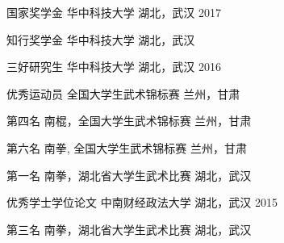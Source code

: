 \begin{xframe}{}
    \begin{cvhonors}

        \cvhonor
        {国家奖学金} %
        {华中科技大学} %
        {湖北，武汉} %
        {2017} %

        \cvhonor
        {知行奖学金} %
        {华中科技大学} %
        {湖北，武汉} %
        {} %


        \cvhonor
        {三好研究生} %
        {华中科技大学} %
        {湖北，武汉} %
        {2016} %




        \cvhonor
        {优秀运动员} %
        {全国大学生武术锦标赛} %
        {兰州，甘肃} %
        { } %


        \cvhonor
        {第四名} %
        {南棍，全国大学生武术锦标赛} %
        {兰州，甘肃} %
        { } %


        \cvhonor
        {第六名} %
        {南拳, 全国大学生武术锦标赛} %
        {兰州，甘肃} %
        { } %


        \cvhonor
        {第一名} %
        {南拳，湖北省大学生武术比赛} %
        {湖北，武汉} %
        { } %


        \cvhonor
        {优秀学士学位论文} %
        {中南财经政法大学} %
        {湖北，武汉} %
        {2015} %



        \cvhonor
        {第三名} %
        {南拳，湖北省大学生武术比赛} %
        {湖北，武汉} %
        { } %
    \end{cvhonors}
\end{xframe}

